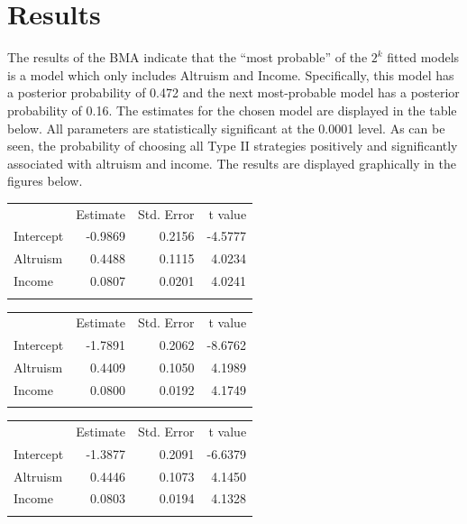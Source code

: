 \documentclass[]{elsarticle}
\begin{document}
\section{Results}\label{results}

The results of the BMA indicate that the ``most probable'' of the $2^k$
fitted models is a model which only includes Altruism and Income.
Specifically, this model has a posterior probability of 0.472 and the
next most-probable model has a posterior probability of 0.16. The
estimates for the chosen model are displayed in the table below. All
parameters are statistically significant at the 0.0001 level. As can be
seen, the probability of choosing all Type II strategies positively and
significantly associated with altruism and income. The results are
displayed graphically in the figures below.

\begin{longtable}[c]{@{}lrrr@{}}
\toprule\addlinespace
& Estimate & Std. Error & t value
\\\addlinespace
\midrule\endhead
Intercept & -0.9869 & 0.2156 & -4.5777
\\\addlinespace
Altruism & 0.4488 & 0.1115 & 4.0234
\\\addlinespace
Income & 0.0807 & 0.0201 & 4.0241
\\\addlinespace
\bottomrule
\end{longtable}

\begin{longtable}[c]{@{}lrrr@{}}
\toprule\addlinespace
& Estimate & Std. Error & t value
\\\addlinespace
\midrule\endhead
Intercept & -1.7891 & 0.2062 & -8.6762
\\\addlinespace
Altruism & 0.4409 & 0.1050 & 4.1989
\\\addlinespace
Income & 0.0800 & 0.0192 & 4.1749
\\\addlinespace
\bottomrule
\end{longtable}

\begin{longtable}[c]{@{}lrrr@{}}
\toprule\addlinespace
& Estimate & Std. Error & t value
\\\addlinespace
\midrule\endhead
Intercept & -1.3877 & 0.2091 & -6.6379
\\\addlinespace
Altruism & 0.4446 & 0.1073 & 4.1450
\\\addlinespace
Income & 0.0803 & 0.0194 & 4.1328
\\\addlinespace
\bottomrule
\end{longtable}
\end{document}
